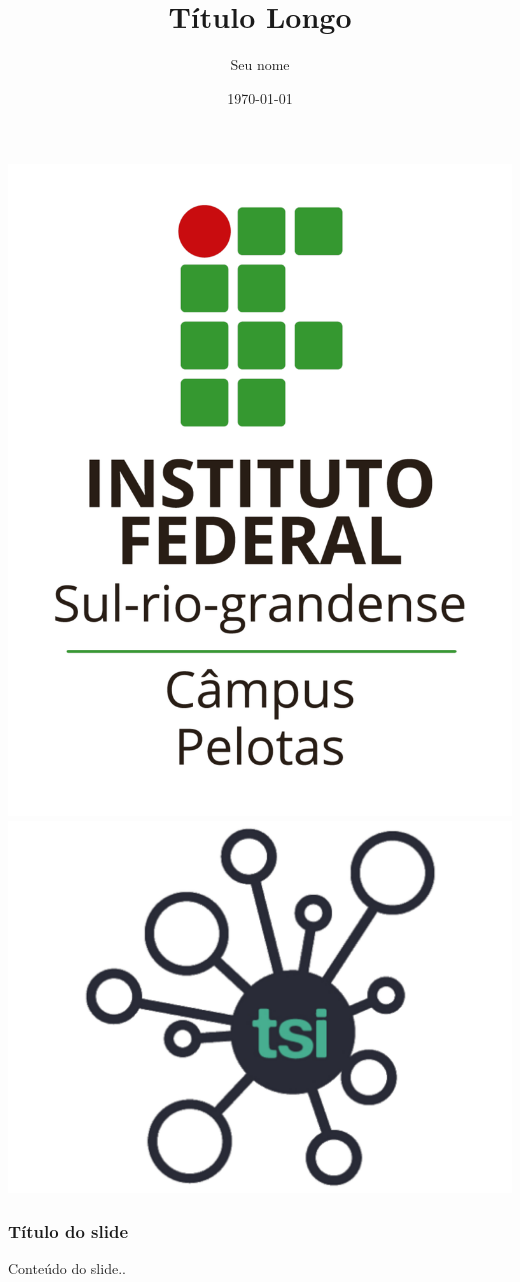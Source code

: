 \documentclass{beamer}
\title[Título curto]{\large{Título Longo}} %
\author{Seu nome} %
\institute[Seu instituto]
{
\url{seu@email.com} \\
\vspace{0.5cm}
Trabalho de Conclusão de Curso \\
Orientador: Nome do orientador \\
\hspace{0.5 cm}
}
\date{\today} %
\begin{document}
\begin{frame}
\vspace{-0.5cm}
\begin{center}
\includegraphics[scale=0.0425]{if.pdf}
\hspace{6cm}
\includegraphics[scale=0.13]{tsi.pdf}
\end{center}
\vspace{-0.75cm}
\titlepage %
\end{frame}

\begin{frame} \frametitle{Título do slide}

Conteúdo do slide..

\end{frame}
\end{document}
